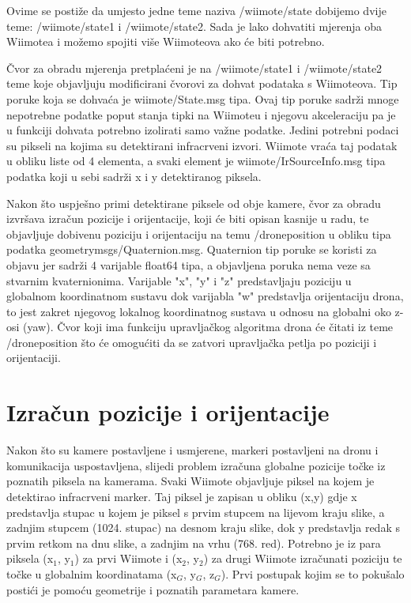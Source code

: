 \documentclass[times, utf8, diplomski]{fer}
\begin{document}
Ovime se postiže da umjesto jedne teme naziva /wiimote/state dobijemo dvije teme: /wiimote/state1 i /wiimote/state2. Sada je lako dohvatiti mjerenja oba Wiimotea i možemo spojiti više Wiimoteova ako će biti potrebno.

Čvor za obradu mjerenja pretplaćeni je na /wiimote/state1 i /wiimote/state2 teme koje objavljuju modificirani čvorovi za dohvat podataka s Wiimoteova. Tip poruke koja se dohvaća je wiimote/State.msg tipa. Ovaj tip poruke sadrži mnoge nepotrebne podatke poput stanja tipki na Wiimoteu i njegovu akceleraciju pa je u funkciji dohvata potrebno izolirati samo važne podatke. Jedini potrebni podaci su pikseli na kojima su detektirani infracrveni izvori. Wiimote vraća taj podatak u obliku liste od 4 elementa, a svaki element je wiimote/IrSourceInfo.msg tipa podatka koji u sebi sadrži x i y detektiranog piksela.

Nakon što uspješno primi detektirane piksele od obje kamere, čvor za obradu izvršava izračun pozicije i orijentacije, koji će biti opisan kasnije u radu, te objavljuje dobivenu poziciju i orijentaciju na temu /drone\textunderscore position u obliku tipa podatka geometry\textunderscore msgs/Quaternion.msg. Quaternion tip poruke se koristi za objavu jer sadrži 4 varijable float64 tipa, a objavljena poruka nema veze sa stvarnim kvaternionima. Varijable "x", "y" i "z" predstavljaju poziciju u globalnom koordinatnom sustavu dok varijabla "w" predstavlja orijentaciju drona, to jest zakret njegovog lokalnog koordinatnog sustava u odnosu na globalni oko z-osi (yaw). Čvor koji ima funkciju upravljačkog algoritma drona će čitati iz teme /drone\textunderscore position što će omogućiti da se zatvori upravljačka petlja po poziciji i orijentaciji.

\chapter{Izračun pozicije i orijentacije}
Nakon što su kamere postavljene i usmjerene, markeri postavljeni na dronu i komunikacija uspostavljena, slijedi problem izračuna globalne pozicije točke iz poznatih piksela na kamerama. Svaki Wiimote objavljuje piksel na kojem je detektirao infracrveni marker. Taj piksel je zapisan u obliku (x,y) gdje x predstavlja stupac u kojem je piksel s prvim stupcem na lijevom kraju slike, a zadnjim stupcem (1024. stupac) na desnom kraju slike, dok y predstavlja redak s prvim retkom na dnu slike, a zadnjim na vrhu (768. red). Potrebno je iz para piksela (x$_1$, y$_1$) za prvi Wiimote i (x$_2$, y$_2$) za drugi Wiimote izračunati poziciju te točke u globalnim koordinatama (x$_G$, y$_G$, z$_G$). Prvi postupak kojim se to pokušalo postići je pomoću geometrije i poznatih parametara kamere.
\end{document}

